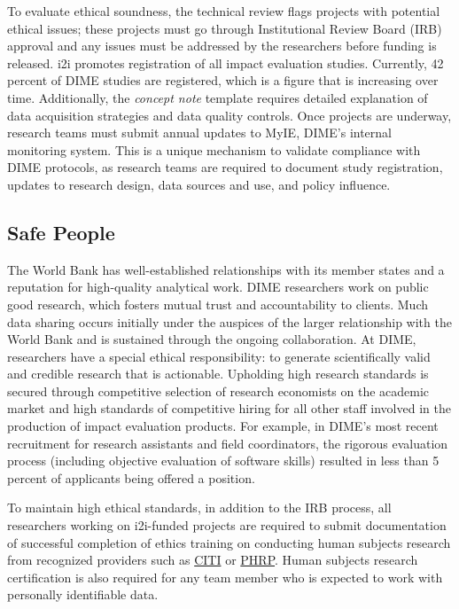 To evaluate ethical soundness, the technical review flags projects with potential ethical issues; these projects must go through Institutional Review Board (IRB) approval and any issues must be addressed by the researchers before funding is released. i2i promotes registration of all impact evaluation studies. Currently, 42 percent of DIME studies are registered, which is a figure that is increasing over time. Additionally, the \emph{concept note} template requires detailed explanation of data acquisition strategies and data quality controls. Once projects are underway, research teams must submit annual updates to MyIE, DIME's internal monitoring system. This is a unique mechanism to validate compliance with DIME protocols, as research teams are required to document study registration, updates to research design, data sources and use, and policy influence.

\hypertarget{safe-people-6}{%
\subsection{Safe People}\label{safe-people-6}}

The World Bank has well-established relationships with its member states and a reputation for high-quality analytical work. DIME researchers work on public good research, which fosters mutual trust and accountability to clients. Much data sharing occurs initially under the auspices of the larger relationship with the World Bank and is sustained through the ongoing collaboration. At DIME, researchers have a special ethical responsibility: to generate scientifically valid and credible research that is actionable. Upholding high research standards is secured through competitive selection of research economists on the academic market and high standards of competitive hiring for all other staff involved in the production of impact evaluation products. For example, in DIME's most recent recruitment for research assistants and field coordinators, the rigorous evaluation process (including objective evaluation of software skills) resulted in less than 5 percent of applicants being offered a position.

To maintain high ethical standards, in addition to the IRB process, all researchers working on i2i-funded projects are required to submit documentation of successful completion of ethics training on conducting human subjects research from recognized providers such as \href{https://about.citiprogram.org/en/homepage/}{CITI} or \href{https://phrptraining.com/}{PHRP}. Human subjects research certification is also required for any team member who is expected to work with personally identifiable data.

